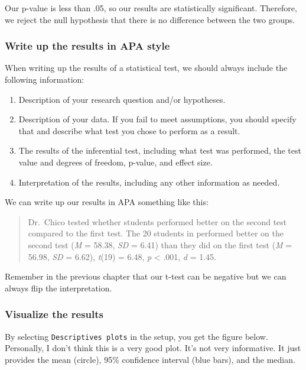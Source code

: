 \documentclass[
]{book}
\providecommand{\tightlist}{%
  \setlength{\itemsep}{0pt}\setlength{\parskip}{0pt}}
\begin{document}
Our p-value is less than .05, so our results are statistically significant. Therefore, we reject the null hypothesis that there is no difference between the two groups.

\hypertarget{write-up-the-results-in-apa-style-2}{%
\subsubsection{Write up the results in APA style}\label{write-up-the-results-in-apa-style-2}}

When writing up the results of a statistical test, we should always include the following information:

\begin{enumerate}
\def\labelenumi{\arabic{enumi}.}
\tightlist
\item
  Description of your research question and/or hypotheses.
\item
  Description of your data. If you fail to meet assumptions, you should specify that and describe what test you chose to perform as a result.
\item
  The results of the inferential test, including what test was performed, the test value and degrees of freedom, p-value, and effect size.
\item
  Interpretation of the results, including any other information as needed.
\end{enumerate}

We can write up our results in APA something like this:

\begin{quote}
Dr.~Chico tested whether students performed better on the second test compared to the first test. The 20 students in performed better on the second test (\emph{M} = 58.38, \emph{SD} = 6.41) than they did on the first test (\emph{M} = 56.98, \emph{SD} = 6.62), \emph{t}(19) = 6.48, \emph{p} \textless{} .001, \emph{d} = 1.45.
\end{quote}

Remember in the previous chapter that our t-test can be negative but we can always flip the interpretation.

\hypertarget{visualize-the-results-2}{%
\subsubsection{Visualize the results}\label{visualize-the-results-2}}

By selecting \texttt{Descriptives\ plots} in the setup, you get the figure below. Personally, I don't think this is a very good plot. It's not very informative. It just provides the mean (circle), 95\% confidence interval (blue bars), and the median.
\end{document}
